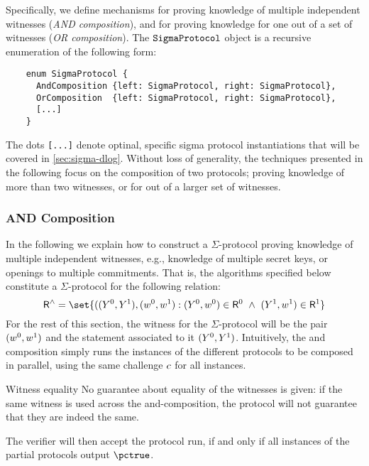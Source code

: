 \documentclass[11pt]{article}
\begin{document}
  Specifically, we define mechanisms for proving knowledge of multiple independent witnesses (\emph{AND composition}), and for proving knowledge for one out of a set of witnesses (\emph{OR composition}). The $\texttt{SigmaProtocol}$ object is a recursive enumeration of the following form:

  \begin{verbatim}
    enum SigmaProtocol {
      AndComposition {left: SigmaProtocol, right: SigmaProtocol},
      OrComposition  {left: SigmaProtocol, right: SigmaProtocol},
      [...]
    }
  \end{verbatim}

The dots \texttt{[...]} denote optinal, specific sigma protocol instantiations that will be covered in \cref{sec:sigma-dlog}.
  Without loss of generality, the techniques presented in the following focus on the composition of two protocols;
  proving knowledge of more than two witnesses, or for out of a larger set of witnesses.

  \subsubsection{AND Composition}
  In the following we explain how to construct a $\Sigma$-protocol proving knowledge of multiple independent witnesses, e.g., knowledge of multiple secret keys, or openings to multiple commitments.
  That is, the algorithms specified below constitute a $\Sigma$-protocol for the following relation:
\[
  \relation^\land = \set{
    ((\statement^0,\statement^1),(\witness^0,\witness^1) : (\statement^0,\witness^0)\in \relation^0 ~\land~ (\statement^1,\witness^1)\in\relation^1}
\]
For the rest of this section, the witness for the $\Sigma$-protocol
will be the pair $(w^0, w^1)$ and the statement associated to it
$(Y^0, Y^1)$.
  Intuitively, the and composition simply runs the instances of the different protocols to be composed in parallel, using the same challenge $c$ for all instances.
  \begin{remark}{Witness equality}{}
  No guarantee about equality of the witnesses is given: if the same witness is used across the and-composition, the protocol will not guarantee that they are indeed the same.
  \end{remark}
	The verifier will then accept the protocol run, if and only if all instances of the partial protocols output $\accept$.
\end{document}
